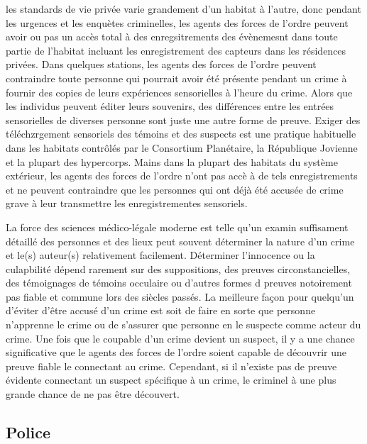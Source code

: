                les standards de vie privée varie grandement d'un habitat à l'autre, donc pendant les urgences et les enquètes criminelles, les agents des forces de l'ordre peuvent avoir ou pas un accès total à des enregsitrements des évènemesnt dans toute partie de l'habitat incluant les enregistrement des capteurs dans les résidences privées. Dans quelques stations, les agents des forces de l'ordre peuvent contraindre toute personne qui pourrait avoir été présente pendant un crime à fournir des copies de leurs expériences sensorielles à l'heure du crime. Alors que les individus peuvent éditer leurs souvenirs, des différences entre les entrées sensorielles de diverses personne sont juste une autre forme de preuve. Exiger des téléchzrgement sensoriels des témoins et des suspects est une pratique habituelle dans les habitats contrôlés par le Consortium Planétaire, la République Jovienne et la plupart des hypercorps. Mains dans la plupart des habitats du système extérieur, les agents des forces de l'ordre n'ont pas accè à de tels enregistrements et ne peuvent contraindre que les personnes qui ont déjà été accusée de crime grave à leur transmettre les enregistrementes sensoriels. 

               La force des sciences médico-légale moderne est telle qu'un examin suffisament détaillé des personnes et des lieux peut souvent déterminer la nature d'un crime et le(s) auteur(s) relativement facilement. Déterminer l'innocence ou la culapbilité dépend rarement sur des suppositions, des preuves circonstancielles, des témoignages de témoins occulaire ou d'autres formes d preuves notoirement pas fiable et commune lors des siècles passés. La meilleure façon pour quelqu'un d'éviter d'être accusé d'un crime est soit de faire en sorte que personne n'apprenne le crime ou de s'assurer que personne en le suspecte comme acteur du crime. Une fois que le coupable d'un crime devient un suspect, il y a une chance significative que le agents des forces de l'ordre soient capable de découvrir une preuve fiable le connectant au crime. Cependant, si il n'existe pas de preuve évidente connectant un suspect spécifique à un crime, le criminel à une plus grande chance de ne pas être découvert. 

               \subsection{Police} \label{sec:law-enforcement} 


